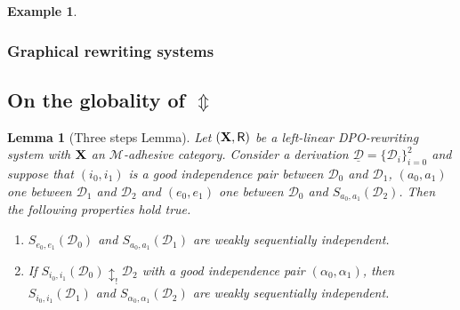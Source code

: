 \documentclass[a4paper]{article}
\def\R{\mathsf{R}}
\def\X{\textbf {\textup{X}}}
\newcommand{\dder}[1]{\mathscr{#1}}
\newcommand{\der}[1]{\underline{\dder{#1}}}
\newtheorem{lemma}[theorem]{Lemma}
\theoremstyle{definition}
\newtheorem{example}[theorem]{Example}
\begin{document}
\begin{example}\label{ex:contro}
\end{example}



\subsubsection{Graphical rewriting systems}\label{subsubsec:graphical}


\subsection{On the globality of $\Updownarrow$}


\begin{lemma}[Three steps Lemma]\label{lem:iig1}Let $(\X,\R)$ be a left-linear DPO-rewriting system with $\X$ an $\mathcal{M}$-adhesive category. Consider a derivation $\der{D}=\{\dder{D}_i\}_{i=0}^2$ and suppose that $(i_0,i_1)$ is a good independence pair between $\dder{D}_0$ and $\dder{D}_1$, $(a_0,a_1)$ one between $\dder{D}_1$ and $\dder{D}_2$ and $(e_0, e_1)$ one between $\dder{D}_0$ and $S_{a_0,a_1}(\dder{D}_2)$. Then the following properties hold true.
	\begin{enumerate}
		\item $S_{e_0,e_1}(\dder{D}_0)$ and $S_{a_0,a_1}(\dder{D}_1)$ are weakly sequentially independent.
		\item If $S_{i_0, i_1}(\dder{D}_0)\updownarrow_! \dder{D}_2$ with a good independence pair $(\alpha_0, \alpha_1)$, then  $S_{i_0,i_1}(\dder{D}_1)$ and $S_{\alpha_0, \alpha_1}(\dder{D}_2)$ are weakly sequentially independent.
	\end{enumerate}
	
\end{lemma}
\end{document}
